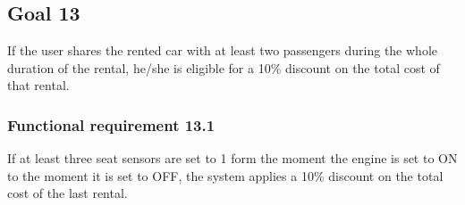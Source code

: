 \subsection{Goal 13}
If the user shares the rented car with at least two passengers during the whole duration of the rental, he/she is eligible for a 10\% discount on the total cost of that rental.

\setcounter{secnumdepth}{3}
\subsubsection{Functional requirement 13.1}
If at least three seat sensors are set to 1 form the moment the engine is set to ON to the moment it is set to OFF, the system applies a 10\% discount on the total cost of the last rental.